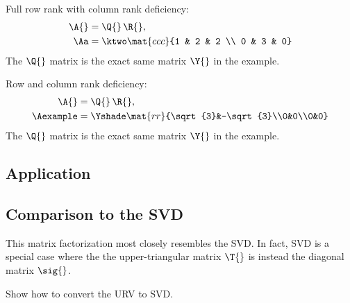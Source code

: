 Full row rank with column rank deficiency:
\begin{equation}
  \begin{split}
    \A{} & = \Q{}\,\R{},\\
    \Aa & =
    \ktwo
    \mat{ccc}{1 & 2 & 2 \\ 0 & 3 & 0}
  \end{split}
\end{equation}
The $\Q{}$ matrix is the exact same matrix $\Y{}$ in the example.


Row and column rank deficiency:
\begin{equation}
  \begin{split}
    \A{} & = \Q{}\,\R{},\\
    \Aexample & =
    \Yshade
    \mat{rr}{\sqrt{3}&-\sqrt{3}\\0&0\\0&0}
  \end{split}
\end{equation}
The $\Q{}$ matrix is the exact same matrix $\Y{}$ in the example.


\subsection{Application}

\subsection{Comparison to the SVD}
This matrix factorization most closely resembles the SVD. In fact, SVD is a special case where the the upper-triangular matrix $\T{}$ is instead the diagonal matrix $\sig{}$.

Show how to convert the URV to SVD.

\endinput